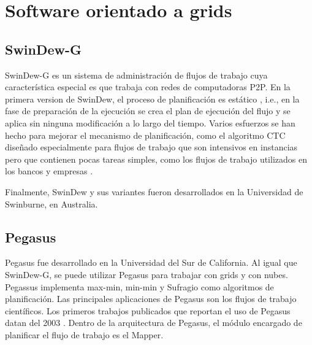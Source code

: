 \section{Software orientado a grids}

\subsection{SwinDew-G}


SwinDew-G \cite{yang2007peer} es un sistema de administración de flujos de trabajo cuya característica especial es que trabaja con redes de computadoras P2P. En la primera version de SwinDew, el proceso de planificación es estático \cite{yang2007peer}, i.e., en la fase de preparación de la ejecución se crea el plan de ejecución del flujo y se aplica sin ninguna modificación a lo largo del tiempo. Varios esfuerzos se han hecho para mejorar el mecanismo de planificación, como el algoritmo CTC \cite{liu2010compromised} diseñado especialmente para flujos de trabajo que son intensivos en instancias pero que contienen pocas tareas simples, como los flujos de trabajo utilizados en los bancos y empresas \cite{liu2011novel}.

Finalmente, SwinDew y sus variantes fueron desarrollados en la Universidad de Swinburne, en Australia.

\subsection{Pegasus}

Pegasus \cite{deelman2005pegasus} fue desarrollado en la Universidad del Sur de California. Al igual que SwinDew-G, se puede utilizar Pegasus para trabajar con grids y con nubes. Pegassus implementa max-min, min-min y Sufragio como algoritmos de planificación. Las principales aplicaciones de Pegasus son los flujos de trabajo científicos. Los primeros trabajos publicados que reportan el uso de Pegasus datan del 2003 \cite{pegasus2014publications}. Dentro de la arquitectura de Pegasus, el módulo encargado de planificar el flujo de trabajo es el Mapper.

